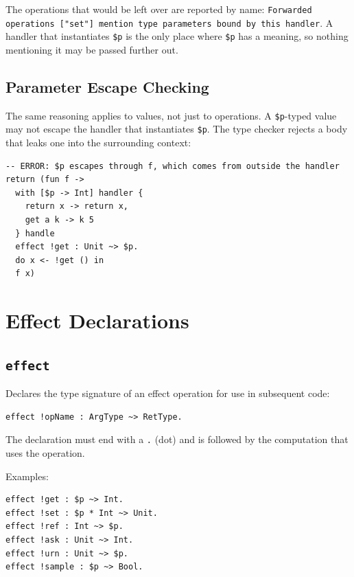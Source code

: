 \documentclass[11pt,a4paper]{article}
\begin{document}
The operations that would be left over are reported by name:
\texttt{Forwarded operations ["set"] mention type parameters bound by this
handler}.  A handler that instantiates \texttt{\$p} is the only place where
\texttt{\$p} has a meaning, so nothing mentioning it may be passed further
out.

\subsection{Parameter Escape Checking}

The same reasoning applies to values, not just to operations.  A
\texttt{\$p}-typed value may not escape the handler that instantiates
\texttt{\$p}.  The type checker rejects a body that leaks one into the surrounding context:

\begin{lstlisting}
-- ERROR: $p escapes through f, which comes from outside the handler
return (fun f ->
  with [$p -> Int] handler {
    return x -> return x,
    get a k -> k 5
  } handle
  effect !get : Unit ~> $p.
  do x <- !get () in
  f x)
\end{lstlisting}

\section{Effect Declarations}
\label{sec:effect}

\subsection{\texttt{effect}}

Declares the type signature of an effect operation for use in subsequent code:

\begin{lstlisting}
effect !opName : ArgType ~> RetType.
\end{lstlisting}

The declaration must end with a \texttt{.} (dot) and is followed by the
computation that uses the operation.

Examples:

\begin{lstlisting}
effect !get : $p ~> Int.
effect !set : $p * Int ~> Unit.
effect !ref : Int ~> $p.
effect !ask : Unit ~> Int.
effect !urn : Unit ~> $p.
effect !sample : $p ~> Bool.
\end{lstlisting}
\end{document}
